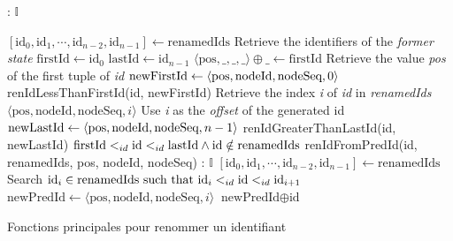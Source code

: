 \begin{algorithm}[!ht]
    \footnotesize
    \begin{algorithmic}[1]
         {: $\mathbb{I}$}

            \Statex
            \State $[\text{id}_0, \text{id}_1, \cdots, \text{id}_{n-2}, \text{id}_{n-1}] \gets \text{renamedIds}$
            \Comment Retrieve the identifiers of the \emph{former state}
            \State $\text{firstId} \gets \text{id}_0$
            \State $\text{lastId} \gets \text{id}_{n - 1}$
            \State $\langle \text{pos}, \_, \_, \_ \rangle \oplus \_ \gets \text{firstId}$
              \label{alg:renameId-get-pos}
            \Comment Retrieve the value \emph{pos} of the first tuple of \emph{id}
            \Statex
                \State $\text{newFirstId} \gets \langle \text{pos},\text{nodeId},\text{nodeSeq},0 \rangle$
                \State \Return renIdLessThanFirstId(id, newFirstId)
                \label{alg:renameId-id-in-renamedids-begin}
                \State Retrieve the index \emph{i} of \emph{id} in \emph{renamedIds}
                \State \Return $\langle \text{pos}, \text{nodeId}, \text{nodeSeq}, i \rangle$ \label{alg:renameId-id-in-renamedids-end}
                \Comment Use \emph{i} as the \emph{offset} of the generated id
                \State $\text{newLastId} \gets \langle \text{pos},\text{nodeId},\text{nodeSeq},n-1 \rangle$
                \State \Return renIdGreaterThanLastId(id, newLastId)
            \Else
                  \label{alg:renameId-main-case}
                \Statex \Comment $\text{firstId} <_{id} \text{id} <_{id} \text{lastId} \land \text{id} \notin \text{renamedIds}$
                \State \Return renIdFromPredId(id, renamedIds, pos, nodeId, nodeSeq)
            \EndIf
        \EndFunction
        \Statex
         {: $\mathbb{I}$}
            \Statex
            \State $[\text{id}_0, \text{id}_1, \cdots, \text{id}_{n-2}, \text{id}_{n-1}] \gets \text{renamedIds}$
            \State Search $\text{id}_i \in \text{renamedIds such that id}_i <_{id} \text{id} <_{id} \text{id}_{i+1}$ \label{alg:renameId-find-predecessor}
            \State $\text{newPredId} \gets \langle \text{pos}, \text{nodeId}, \text{nodeSeq}, i \rangle$ \label{alg:renameId-rename-predecessor}
            \State \Return $\text{newPredId} \oplus \text{id}$ \label{alg:renameId-concat-predecessor}
        \EndFunction
    \end{algorithmic}
    \caption{Fonctions principales pour renommer un identifiant}
    \label{alg:renameId}
  \end{algorithm}

